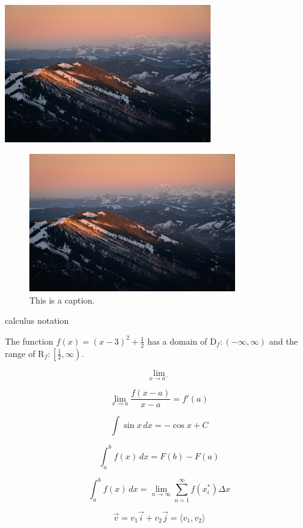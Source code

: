 \documentclass[10pt, letterpaper]{article}
\begin{document}
\begin{center}
    \includegraphics[width=3.5in]{1.jpg}
\end{center}

\begin{figure}[H]
    \centering
    \includegraphics[width=3.5in]{1.jpg}
    \caption{This is a caption.}
\end{figure}


calculus notation

The function $f(x)=(x-3)^2+\frac{1}2{}$ has a domain of $\mathrm{D}_f:(-\infty, \infty)$ and the range of $\mathrm{R}_f:\left[\frac{1}2, \infty\right)$. %

$$\lim \limits_{x \to a^-}$$

$$\displaystyle{\lim \limits_{x \to a} \frac{f(x-a)}{x-a} = f'(a)}$$

$$\displaystyle{\int \sin x \, dx = - \cos x + C}$$

$$\displaystyle{\int_a^b f(x) \, dx = F(b) - F(a)}$$

$$\displaystyle{\int_a^b f(x) \, dx = \lim \limits_{n \to \infty} \sum_{n=1}^\infty f(x_i^*) \Delta x}$$

$$\displaystyle{\vec{v} = v_1\vec{i} + v_2\vec{j} = \langle v_1, v_2\rangle }$$
\end{document}

